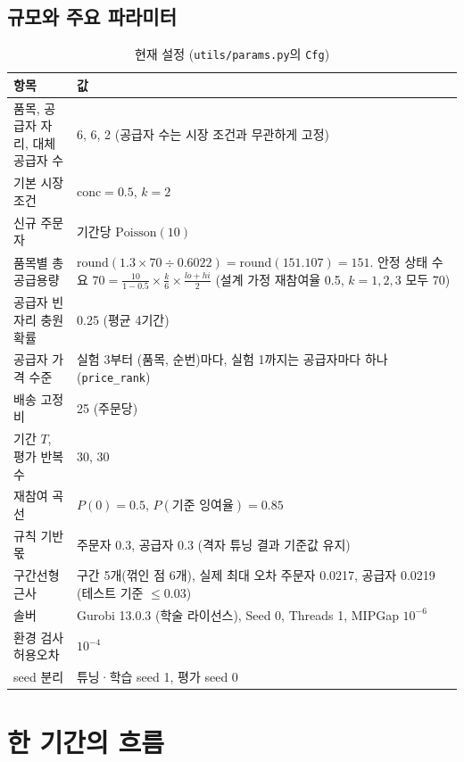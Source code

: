 \documentclass[11pt,a4paper]{article}
\begin{document}
\subsection{규모와 주요 파라미터}

\begin{table}[H]
\centering\small
\caption{현재 설정 (\texttt{utils/params.py}의 \texttt{Cfg})}
\begin{tabularx}{\linewidth}{lY}
\toprule
항목 & 값\\
\midrule
품목, 공급자 자리, 대체 공급자 수 & 6, 6, 2 (공급자 수는 시장 조건과 무관하게 고정)\\
기본 시장 조건 & $\mathrm{conc}=0.5$, $k=2$\\
신규 주문자 & 기간당 $\mathrm{Poisson}(10)$\\
품목별 총 공급용량 & $\mathrm{round}(1.3\times 70\div 0.6022)=\mathrm{round}(151.107)=151$.
안정 상태 수요 $70=\frac{10}{1-0.5}\times\frac{k}{6}\times\frac{lo+hi}{2}$ (설계 가정 재참여율 0.5, $k=1,2,3$ 모두 70)\\
공급자 빈자리 충원 확률 & 0.25 (평균 4기간)\\
공급자 가격 수준 & 실험 3부터 (품목, 순번)마다, 실험 1까지는 공급자마다 하나 (\texttt{price\_rank})\\
배송 고정비 & 25 (주문당)\\
기간 $T$, 평가 반복 수 & 30, 30\\
재참여 곡선 & $P(0)=0.5$, $P(\text{기준 잉여율})=0.85$\\
규칙 기반 몫 & 주문자 0.3, 공급자 0.3 (격자 튜닝 결과 기준값 유지)\\
구간선형 근사 & 구간 5개(꺾인 점 6개), 실제 최대 오차 주문자 0.0217, 공급자 0.0219 (테스트 기준 $\le 0.03$)\\
솔버 & Gurobi 13.0.3 (학술 라이선스), Seed 0, Threads 1, MIPGap $10^{-6}$\\
환경 검사 허용오차 & $10^{-4}$\\
seed 분리 & 튜닝·학습 seed 1, 평가 seed 0\\
\bottomrule
\end{tabularx}
\end{table}

\section{한 기간의 흐름}
\end{document}
